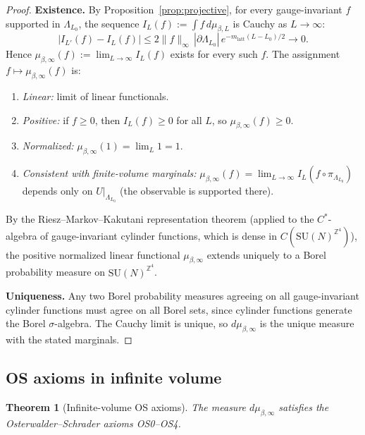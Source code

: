 \documentclass[11pt,a4paper]{amsart}
\newtheorem{theorem}{Theorem}[section]
\theoremstyle{definition}
\newcommand{\SU}{\mathrm{SU}}
\newcommand{\Z}{\mathbb{Z}}
\begin{document}
\begin{proof}
\textbf{Existence.}
By Proposition~\ref{prop:projective}, for every gauge-invariant $f$ supported in $\Lambda_{L_0}$,
the sequence $I_L(f) := \int f\,d\mu_{\beta,L}$ is Cauchy as $L\to\infty$:
\[
  |I_{L'}(f) - I_L(f)| \le 2\|f\|_\infty\,|\partial\Lambda_{L_0}|\,e^{-m_{\mathrm{latt}}(L-L_0)/2} \to 0.
\]
Hence $\mu_{\beta,\infty}(f) := \lim_{L\to\infty} I_L(f)$ exists for every such $f$.
The assignment $f\mapsto \mu_{\beta,\infty}(f)$ is:
\begin{enumerate}[label=(\roman*)]
\item \emph{Linear:} limit of linear functionals.
\item \emph{Positive:} if $f\ge 0$, then $I_L(f)\ge 0$ for all $L$, so $\mu_{\beta,\infty}(f)\ge 0$.
\item \emph{Normalized:} $\mu_{\beta,\infty}(1) = \lim_L 1 = 1$.
\item \emph{Consistent with finite-volume marginals:}
  $\mu_{\beta,\infty}(f) = \lim_{L\to\infty} I_L(f\circ\pi_{\Lambda_{L_0}})$ depends
  only on $U|_{\Lambda_{L_0}}$ (the observable is supported there).
\end{enumerate}

By the Riesz--Markov--Kakutani representation theorem (applied to the $C^*$-algebra
of gauge-invariant cylinder functions, which is dense in $C(\SU(N)^{\Z^4})$),
the positive normalized linear functional $\mu_{\beta,\infty}$ extends uniquely to a
Borel probability measure on $\SU(N)^{\Z^4}$.

\textbf{Uniqueness.}
Any two Borel probability measures agreeing on all gauge-invariant cylinder
functions must agree on all Borel sets, since cylinder functions generate the
Borel $\sigma$-algebra.  The Cauchy limit is unique, so $d\mu_{\beta,\infty}$
is the unique measure with the stated marginals.
\end{proof}

\subsection{OS axioms in infinite volume}
\label{sec:infvol_OS}

\begin{theorem}[Infinite-volume OS axioms]
\label{thm:infvol_OS}
The measure $d\mu_{\beta,\infty}$ satisfies the Osterwalder--Schrader axioms
\emph{OS0--OS4}.
\end{theorem}
\end{document}
